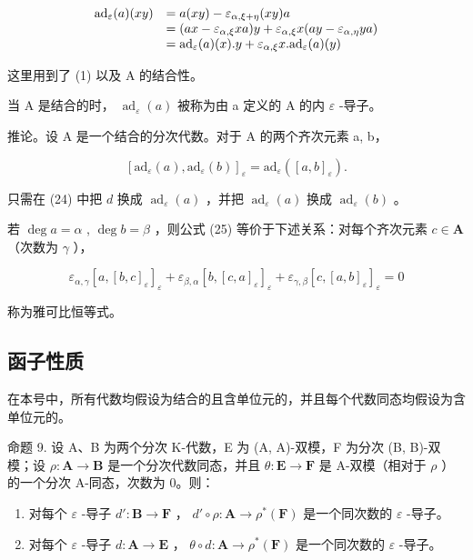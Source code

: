 \[
\begin{array}{r l} \mathrm{ad} _ {\varepsilon} (a) (x y) & = a (x y) - \varepsilon_ {\alpha , \xi + \eta} (x y) a \\ & = (a x - \varepsilon_ {\alpha , \xi} x a) y + \varepsilon_ {\alpha , \xi} x (a y - \varepsilon_ {\alpha , \eta} y a) \\ & = \mathrm{ad} _ {\varepsilon} (a) (x). y + \varepsilon_ {\alpha , \xi} x. \mathrm{ad} _ {\varepsilon} (a) (y) \end{array}
\]

这里用到了 (1) 以及 A 的结合性。

当 A 是结合的时， \(\operatorname{ad}_{\varepsilon}(a)\) 被称为由 a 定义的 A 的内 \(\varepsilon\) -导子。

推论。设 A 是一个结合的分次代数。对于 A 的两个齐次元素 a, b，

\[
[ \mathrm{ad} _ {\varepsilon} (a), \mathrm{ad} _ {\varepsilon} (b) ] _ {\varepsilon} = \mathrm{ad} _ {\varepsilon} ([ a, b ] _ {\varepsilon}).\tag{25}
\]

只需在 (24) 中把 \(d\) 换成 \(\operatorname{ad}_{\varepsilon}(a)\) ，并把 \(\operatorname{ad}_{\varepsilon}(a)\) 换成 \(\operatorname{ad}_{\varepsilon}(b)\) 。

若 \(\deg a = \alpha\) , \(\deg b = \beta\) ，则公式 (25) 等价于下述关系：对每个齐次元素 \(c \in \mathbf{A}\) （次数为 \(\gamma\) ），

\[
\varepsilon_ {\alpha , \gamma} [ a, [ b, c ] _ {\varepsilon} ] _ {\varepsilon} + \varepsilon_ {\beta , \alpha} [ b, [ c, a ] _ {\varepsilon} ] _ {\varepsilon} + \varepsilon_ {\gamma , \beta} [ c, [ a, b ] _ {\varepsilon} ] _ {\varepsilon} = 0\tag{26}
\]

称为雅可比恒等式。

\subsection{函子性质}

在本号中，所有代数均假设为结合的且含单位元的，并且每个代数同态均假设为含单位元的。

命题 9. 设 A、B 为两个分次 K-代数，E 为 (A, A)-双模，F 为分次 (B, B)-双模；设 \(\rho: \mathbf{A} \to \mathbf{B}\) 是一个分次代数同态，并且 \(\theta: \mathbf{E} \to \mathbf{F}\) 是 A-双模（相对于 \(\rho\) ）的一个分次 A-同态，次数为 0。则：

\begin{enumerate}
\def\labelenumi{(\roman{enumi})}
\item
  对每个 \(\varepsilon\) -导子 \(d':\mathbf{B}\to\mathbf{F}\) ， \(d'\circ\rho:\mathbf{A}\to\rho^{*}(\mathbf{F})\) 是一个同次数的 \(\varepsilon\) -导子。
\item
  对每个 \(\varepsilon\) -导子 \(d: \mathbf{A} \to \mathbf{E}\) ， \(\theta \circ d: \mathbf{A} \to \rho^{*}(\mathbf{F})\) 是一个同次数的 \(\varepsilon\) -导子。
\end{enumerate}

